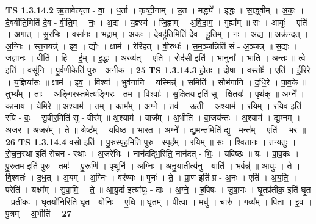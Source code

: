 \documentclass[17pt]{extarticle}
\begin{document}
                  \newline
                                \textbf{ TS 1.3.14.2} \newline
                  ऋ॒तावेत्यृ॒ता - वा॒ । ध॒र्ता । कृ॒ष्टी॒नाम् । उ॒त । मद्ध्ये᳚ । इ॒द्धः ॥ सा॒द्ध्वीम् । अ॒कः॒ । दे॒ववी॑ति॒मिति॑ दे॒व - वी॒ति॒म् । नः॒ । अ॒द्य । य॒ज्ञ्स्य॑ । जि॒ह्वाम् । अ॒वि॒दा॒म॒ । गुह्या᳚म् ॥ सः । आयुः॑ । एति॑ । अ॒गा॒त् । सु॒र॒भिः । वसा॑नः । भ॒द्राम् । अ॒कः॒ । दे॒वहू॑ति॒मिति॑ दे॒व - हू॒ति॒म् । नः॒ । अ॒द्य ॥ अक्र॑न्दत् । अ॒ग्निः । स्त॒नयन्न्॑ । इ॒व॒ । द्यौः । क्षाम॑ । रेरि॑हत् । वी॒रुधः॑ । स॒म॒ञ्जन्निति॑ सं - अ॒ञ्जन्न् ॥ स॒द्यः । ज॒ज्ञा॒नः । वीति॑ । हि । ई॒म् । इ॒द्धः । अख्य॑त् । एति॑ । रोद॑सी॒ इति॑ । भा॒नुना᳚ । भा॒ति॒ । अ॒न्तः ॥ त्वे इति॑ । वसू॑नि । पु॒र्व॒णी॒केति॑ पुरु - अ॒नी॒क॒ । \textbf{  25} \newline
                  \newline
                                \textbf{ TS 1.3.14.3} \newline
                  हो॒तः॒ । दो॒षा । वस्तोः᳚ । एति॑ । ई॒रि॒रे॒ । य॒ज्ञिया॑सः ॥ क्षाम॑ । इ॒व॒ । विश्वा᳚ । भुव॑नानि । यस्मिन्न्॑ । समिति॑ । सौभ॑गानि । द॒धि॒रे । पा॒व॒के ॥ तुभ्य᳚म् । ताः । अ॒ङ्गि॒र॒स्त॒मेत्य॑ङ्गिरः - त॒म॒ । विश्वाः᳚ । सु॒क्षि॒तय॒ इति॑ सु - क्षि॒तयः॑ । पृथ॑क् ॥ अग्ने᳚ । कामा॑य । ये॒मि॒रे॒ ॥ अ॒श्याम॑ । तम् । काम᳚म् । अ॒ग्ने॒ । तव॑ । ऊ॒ती । अ॒श्याम॑ । र॒यिम् । र॒यि॒व॒ इति॑ रयि - वः॒ । सु॒वीर॒मिति॑ सु - वीर᳚म् ॥ अ॒श्याम॑ । वाज᳚म् । अ॒भीति॑ । वा॒जय॑न्तः । अ॒श्याम॑ । द्यु॒म्नम् । अ॒ज॒र॒ । अ॒जर᳚म् । ते॒ ॥ श्रेष्ठ᳚म् । य॒वि॒ष्ठ॒ । भा॒र॒त॒ । अग्ने᳚ । द्यु॒मन्त॒मिति॑ द्यु - मन्त᳚म् । एति॑ । भ॒र॒ ॥ \textbf{  26} \newline
                  \newline
                                \textbf{ TS 1.3.14.4} \newline
                  वसो॒ इति॑ । पु॒रु॒स्पृह॒मिति॑ पुरु - स्पृह᳚म् । र॒यिम् ॥ सः । श्वि॒ता॒नः । त॒न्य॒तुः । रो॒च॒न॒स्था इति॑ रोचन - स्थाः । अ॒जरे॑भिः । नान॑दद्भि॒रिति॒ नान॑दत् - भिः॒ । यवि॑ष्ठः ॥ यः । पा॒व॒कः । पु॒रु॒तम॒ इति॑ पुरु - तमः॑ । पु॒रूणि॑ । पृ॒थूनि॑ । अ॒ग्निः । अ॒नु॒यातीत्य॑नु - याति॑ । भर्वन्न्॑ ॥ आयुः॑ । ते॒ । वि॒श्वतः॑ । द॒ध॒त् । अ॒यम् । अ॒ग्निः । वर᳚ण्यः ॥ पुनः॑ । ते॒ । प्रा॒ण इति॑ प्र - अ॒नः । एति॑ । अ॒य॒ति॒ । परेति॑ । यक्ष्म᳚म् । सु॒वा॒मि॒ । ते॒ ॥ आ॒यु॒र्दा इत्या॑युः - दाः । अ॒ग्ने॒ । ह॒विषः॑ । जु॒षा॒णः । घृ॒तप्र॑तीक॒ इति॑ घृ॒त - प्र॒ती॒कः॒ । घृ॒तयो॑नि॒रिति॑ घृ॒त - यो॒निः॒ । ए॒धि॒ ॥ घृ॒तम् । पी॒त्वा । मधु॑ । चारु॑ । गव्य᳚म् । पि॒ता । इ॒व॒ । पु॒त्रम् । अ॒भीति॑ । \textbf{  27} \newline
                  \newline
\end{document}
